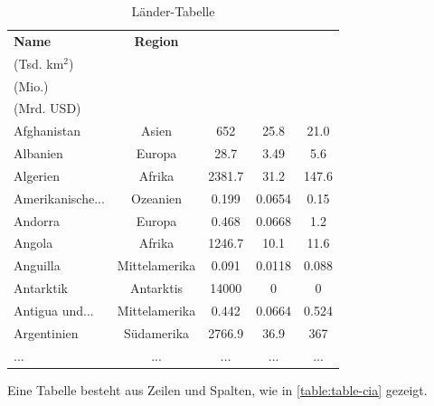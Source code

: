 \begin{table}[H]
  \centering
  \begin{tabular}{lcccc}
    \toprule
    \textbf{Name}    & \textbf{Region} & \makecell{\textbf{Fläche}\\(Tsd. km$^2$)} & \makecell{\textbf{Einwohner}\\(Mio.)} & \makecell{\textbf{BIP}\\(Mrd. USD)} \\
    \midrule
    Afghanistan      & Asien           & 652             & 25.8               & 21.0         \\
    Albanien         & Europa          & 28.7            & 3.49               & 5.6          \\
    Algerien         & Afrika          & 2381.7          & 31.2               & 147.6        \\
    Amerikanische... & Ozeanien        & 0.199           & 0.0654             & 0.15         \\
    Andorra          & Europa          & 0.468           & 0.0668             & 1.2          \\
    Angola           & Afrika          & 1246.7          & 10.1               & 11.6         \\
    Anguilla         & Mittelamerika   & 0.091           & 0.0118             & 0.088        \\
    Antarktik        & Antarktis       & 14000           & 0                  & 0            \\
    Antigua und...   & Mittelamerika   & 0.442           & 0.0664             & 0.524        \\
    Argentinien      & Südamerika      & 2766.9          & 36.9               & 367          \\
    \midrule
    ...              & ...             & ...             & ...                & ...          \\
    \bottomrule
  \end{tabular}
  \caption{Länder-Tabelle}
  \label{table:cia-values}
\end{table}

Eine Tabelle besteht aus Zeilen und Spalten, wie in \cref{table:table-cia} gezeigt.


